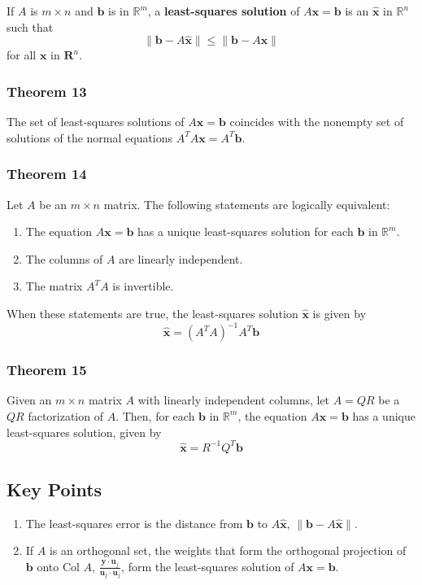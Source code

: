 \documentclass{article}
\begin{document}
If $A$ is $m\times n$ and $\mathbf{b}$ is in $\mathbb{R}^m$, a \textbf{least-squares solution} of
$A\mathbf{x}=\mathbf{b}$ is an $\mathbf{\hat{x}}$ in $\mathbb{R}^n$ such that
\[\|\mathbf{b}-A\mathbf{\hat{x}}\|\leq \|\mathbf{b} - A\mathbf{x}\|\]
for all $\mathbf{x}$ in $\mathbf{R}^n$.

\subsubsection*{Theorem 13}
The set of least-squares solutions of $A\mathbf{x}=\mathbf{b}$ coincides with the nonempty set of
solutions of the normal equations $A^T A\mathbf{x}=A^T\mathbf{b}$.

\subsubsection*{Theorem 14}
Let $A$ be an $m\times n$ matrix. The following statements are logically equivalent:
\begin{enumerate}
    \item The equation $A\mathbf{x}=\mathbf{b}$ has a unique least-squares solution for each
    $\mathbf{b}$ in $\mathbb{R}^m$.
    \item The columns of $A$ are linearly independent.
    \item The matrix $A^T A$ is invertible.
\end{enumerate}

When these statements are true, the least-squares solution $\mathbf{\hat{x}}$ is given by
\[\mathbf{\hat{x}}={(A^T A)}^{-1} A^T \mathbf{b}\]

\subsubsection*{Theorem 15}
Given an $m\times n$ matrix $A$ with linearly independent columns, let $A=QR$ be a $QR$
factorization of $A$. Then, for each $\mathbf{b}$ in $\mathbb{R}^m$, the equation
$A\mathbf{x}=\mathbf{b}$ has a unique least-squares solution, given by
\[\mathbf{\hat{x}}=R^{-1}Q^T \mathbf{b}\]

\subsection*{Key Points}
\begin{enumerate}
    \item The least-squares error is the distance from $\mathbf{b}$ to $A\mathbf{\hat{x}}$,
    $\|\mathbf{b}-A\mathbf{\hat{x}}\|$.
    \item If $A$ is an orthogonal set, the weights that form the orthogonal projection of
    $\mathbf{b}$ onto $\text{Col }A$, $\frac{\mathbf{y}\cdot\mathbf{u}_j}{\mathbf{u}_j\cdot
    \mathbf{u}_j}$, form the least-squares solution of $A\mathbf{x}=\mathbf{b}$.
\end{enumerate}
\end{document}
